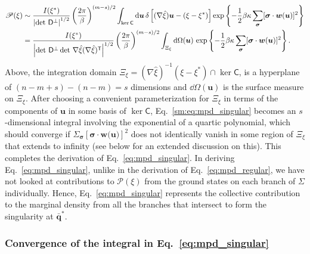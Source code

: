 \begin{equation}
  \begin{aligned}
    \mathscr{P}(\xi) &\sim \frac{I(\xi^{*})}{\left|\det\, \mathsf{D}^\perp\right|^{1/2}} \left(\frac{2\pi}{\beta}\right)^{(m-s)/2} \int_{\ker\mathsf{C}} \mathrm{d}\bm{u}\, \delta\left[(\nabla\hat{\xi})\bm{u} - (\xi - \xi^{*})\right] \exp\left\{-\frac{1}{2}\beta\kappa\sum_{\bm{\sigma}}[\bm{\sigma}\cdot \bm{w}(\bm{u})]^2\right\}\\
                                 &= \frac{I({\xi}^{*})}{\left|\det\, \mathsf{D}^\perp \det\, \nabla\hat{\xi}(\nabla\hat{\xi})^\mathsf{T}\right|^{1/2}}  \left(\frac{2\pi}{\beta}\right)^{(m-s)/2} \int_{\Xi_{\xi}} \mathrm{d}\Omega(\bm{u})\, \exp\left\{-\frac{1}{2}\beta\kappa\sum_{\bm{\sigma}}[\bm{\sigma}\cdot\bm{w}(\bm{u})]^2\right\}.
  \end{aligned}
  \label{sm:eq:mpd_singular}
\end{equation}
%
Above, the integration domain $\Xi_{\xi} = (\nabla\hat{\xi})^{-1}(\xi - \xi^{*}) \cap \ker\mathsf{C}$, is a hyperplane of $(n - m + s) - (n - m) = s$ dimensions and $\dd\Omega(\bm{u})$ is the surface measure on $\Xi_{\xi}$.
After choosing a convenient parameterization for $\Xi_{\xi}$ in terms of the components of $\bm{u}$ in some basis of $\ker\mathsf{C}$, Eq.~\eqref{sm:eq:mpd_singular} becomes an $s$-dimensional integral involving the exponential of a quartic polynomial, which should converge if $\Sigma_{\bm{\sigma}} [\bm{\sigma}\cdot\bm{w}(\bm{u)}]^2$ does not identically vanish in some region of $\Xi_{\xi}$ that extends to infinity (see below for an extended discussion on this).
This completes the derivation of Eq.~\eqref{eq:mpd_singular}.
In deriving Eq.~\eqref{eq:mpd_singular}, unlike in the derivation of Eq.~\eqref{eq:mpd_regular}, we have not looked at contributions to $\mathscr{P}(\xi)$ from the ground states on each branch of $\Sigma$ individually.
Hence, Eq.~\eqref{eq:mpd_singular} represents the collective contribution to the marginal density from all the branches that intersect to form the singularity at $\bar{\bm{q}}^{*}$.

\subsubsection{Convergence of the integral in \texorpdfstring{Eq.~\eqref{eq:mpd_singular}}{Eq. (5)}}
\label{sm:sec:convergence}

